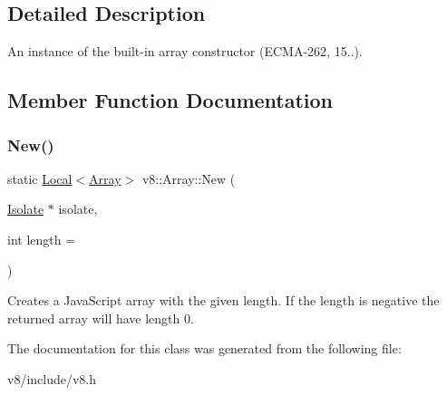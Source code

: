 \subsection{Detailed Description}
An instance of the built-\/in array constructor (E\+C\+M\+A-\/262, 15..). 

\subsection{Member Function Documentation}
\mbox{\label{classv8_1_1Array_a892f18fe6a25dfc0bc7b435759a30226}} 
\subsubsection{\texorpdfstring{New()}{New()}}
{\footnotesize\ttfamily static \mbox{\hyperlink{classv8_1_1Local}{Local}}$<$\mbox{\hyperlink{classv8_1_1Array}{Array}}$>$ v8\+::\+Array\+::\+New (\begin{DoxyParamCaption}\item[{\mbox{\hyperlink{classv8_1_1Isolate}{Isolate}} $\ast$}]{isolate,  }\item[{int}]{length = {} }\end{DoxyParamCaption})\hspace{0.3cm}{\ttfamily [static]}}

Creates a Java\+Script array with the given length. If the length is negative the returned array will have length 0. 

The documentation for this class was generated from the following file\+:\begin{DoxyCompactItemize}
\item 
v8/include/v8.\+h\end{DoxyCompactItemize}
